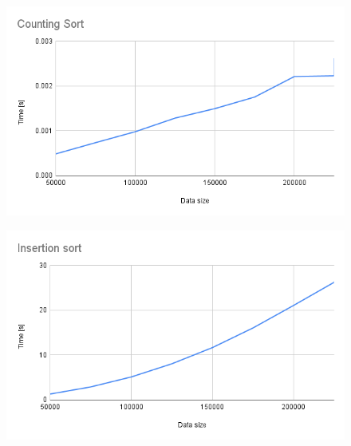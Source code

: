 \begin{minipage}{0.5\textwidth}
    \begin{figure}[H]
        \centering
        \includegraphics[width=1.0\textwidth]{content/Counting_Sort.png}
        \label{fig:Counting_Sort}
    \end{figure}
\end{minipage}
\begin{minipage}{0.5\textwidth}
    \begin{figure}[H]
        \centering
        \includegraphics[width=1.0\textwidth]{content/Insertion_sort.png}
        \label{fig:Insertion_sort}
    \end{figure}
\end{minipage}
